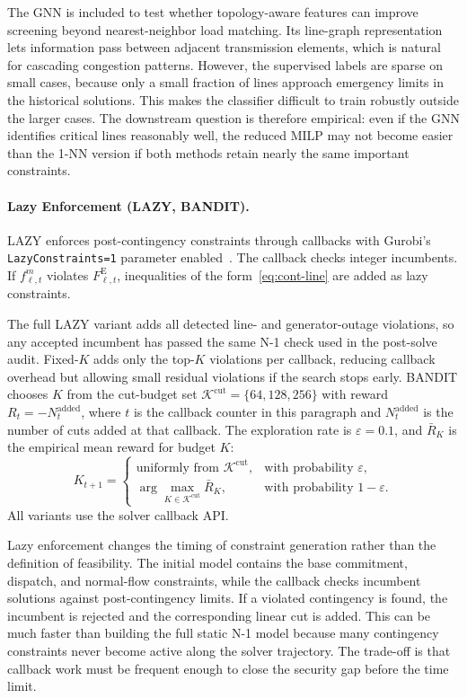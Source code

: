 \documentclass[runningheads]{llncs}
\begin{document}
The GNN is included to test whether topology-aware features can improve screening beyond nearest-neighbor load matching. Its line-graph representation lets information pass between adjacent transmission elements, which is natural for cascading congestion patterns. However, the supervised labels are sparse on small cases, because only a small fraction of lines approach emergency limits in the historical solutions. This makes the classifier difficult to train robustly outside the larger cases. The downstream question is therefore empirical: even if the GNN identifies critical lines reasonably well, the reduced MILP may not become easier than the 1-NN version if both methods retain nearly the same important constraints.

\paragraph{Lazy Enforcement (LAZY, BANDIT).}
LAZY enforces post-contingency constraints through callbacks with Gurobi's \texttt{LazyConstraints=1} parameter enabled~\cite{GurobiLazy}. The callback checks integer incumbents. If $f^{m}_{\ell,t}$ violates $F^{\mathrm{E}}_{\ell,t}$, inequalities of the form~\eqref{eq:cont-line} are added as lazy constraints. 

The full LAZY variant adds all detected line- and generator-outage violations, so any accepted incumbent has passed the same N-1 check used in the post-solve audit. Fixed-$K$ adds only the top-$K$ violations per callback, reducing callback overhead but allowing small residual violations if the search stops early. BANDIT chooses $K$ from the cut-budget set $\mathcal{K}^{\mathrm{cut}}=\{64,128,256\}$ with reward $R_t=-N_t^{\mathrm{added}}$, where $t$ is the callback counter in this paragraph and $N_t^{\mathrm{added}}$ is the number of cuts added at that callback. The exploration rate is $\varepsilon=0.1$, and $\bar R_K$ is the empirical mean reward for budget $K$:
\begin{equation}
K_{t+1}=\begin{cases}
\text{uniformly from }\mathcal{K}^{\mathrm{cut}}, & \text{with probability }\varepsilon, \\
\arg\max_{K\in\mathcal{K}^{\mathrm{cut}}}\bar{R}_K, & \text{with probability }1-\varepsilon.
\end{cases}
\end{equation}
All variants use the solver callback API.

Lazy enforcement changes the timing of constraint generation rather than the definition of feasibility. The initial model contains the base commitment, dispatch, and normal-flow constraints, while the callback checks incumbent solutions against post-contingency limits. If a violated contingency is found, the incumbent is rejected and the corresponding linear cut is added. This can be much faster than building the full static N-1 model because many contingency constraints never become active along the solver trajectory. The trade-off is that callback work must be frequent enough to close the security gap before the time limit.
\end{document}

